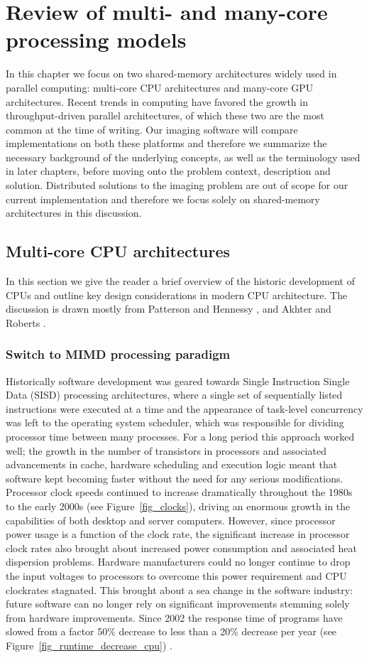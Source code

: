\chapter{Review of multi- and many-core processing models}
In this chapter we focus on two shared-memory architectures widely used in parallel computing: multi-core CPU architectures and many-core GPU architectures. Recent trends in computing
have favored the growth in throughput-driven parallel architectures, of which these two are the most common at the time of writing. Our imaging software will compare implementations on both these platforms and
therefore we summarize the necessary background of the underlying concepts, as well as the terminology used in later chapters, before moving onto the problem context, description and solution. Distributed 
solutions to the imaging problem are out of scope for our current implementation and therefore we focus solely on shared-memory architectures in this discussion.
\section{Multi-core CPU architectures}
In this section we give the reader a brief overview of the historic development of CPUs and outline key design considerations in modern CPU architecture. The discussion is drawn mostly from 
Patterson and Hennessy \cite[ch. 1, 4, 5 and 7]{patterson2009computer}, and Akhter and Roberts \cite[ch. 1, 3 and 6]{akhter2006multi}.
\subsection{Switch to MIMD processing paradigm}
Historically software development was geared towards Single Instruction Single Data (SISD) processing architectures, where a single set of sequentially listed instructions were 
executed at a time and the appearance of task-level concurrency was left to the operating system scheduler, which was responsible for dividing processor time between many processes. 
For a long period this approach worked well; the growth in the number of transistors in processors and associated 
advancements in cache, hardware scheduling and execution logic meant that software kept becoming faster without the need for any serious modifications. Processor clock
speeds continued to increase dramatically throughout the 1980s to the early 2000s (see Figure~\ref{fig_clocks}), driving an enormous growth in the capabilities of both
desktop and server computers. However, since processor power usage is a function of the clock rate, the significant increase in processor clock rates 
also brought about increased power consumption and associated heat dispersion problems. Hardware manufacturers could no longer continue to drop the input 
voltages to processors to overcome this power requirement and CPU clockrates stagnated. This brought about a sea change in the software industry: 
future software can no longer rely on significant improvements stemming solely from hardware improvements. Since 2002 the response time of programs have slowed 
from a factor 50\% decrease to less than a 20\% decrease per year (see Figure~\ref{fig_runtime_decrease_cpu}) \cite{patterson2009computer}.

